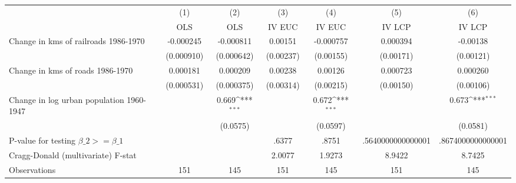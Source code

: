 {
\def\sym#1{\ifmmode^{#1}\else\(^{#1}\)\fi}
\begin{tabular}{l*{6}{c}}
\hline\hline
                &\multicolumn{1}{c}{(1)}&\multicolumn{1}{c}{(2)}&\multicolumn{1}{c}{(3)}&\multicolumn{1}{c}{(4)}&\multicolumn{1}{c}{(5)}&\multicolumn{1}{c}{(6)}\\
                &\multicolumn{1}{c}{OLS}&\multicolumn{1}{c}{OLS}&\multicolumn{1}{c}{IV EUC}&\multicolumn{1}{c}{IV EUC}&\multicolumn{1}{c}{IV LCP}&\multicolumn{1}{c}{IV LCP}\\
\hline
Change in kms of railroads 1986-1970&-0.000245         &-0.000811         &  0.00151         &-0.000757         & 0.000394         & -0.00138         \\
                &(0.000910)         &(0.000642)         &(0.00237)         &(0.00155)         &(0.00171)         &(0.00121)         \\
[1em]
Change in kms of roads 1986-1970& 0.000181         & 0.000209         &  0.00238         &  0.00126         & 0.000723         & 0.000260         \\
                &(0.000531)         &(0.000375)         &(0.00314)         &(0.00215)         &(0.00150)         &(0.00106)         \\
[1em]
Change in log urban population 1960-1947&                  &    0.669\sym{***}&                  &    0.672\sym{***}&                  &    0.673\sym{***}\\
                &                  & (0.0575)         &                  & (0.0597)         &                  & (0.0581)         \\
\hline
P-value for testing $\beta\_{2} >= \beta\_{1}$&                  &                  &    .6377         &    .8751         &.5640000000000001         &.8674000000000001         \\
Cragg-Donald (multivariate) F-stat&                  &                  &   2.0077         &   1.9273         &   8.9422         &   8.7425         \\
Observations    &      151         &      145         &      151         &      145         &      151         &      145         \\
\hline\hline
\end{tabular}
}
